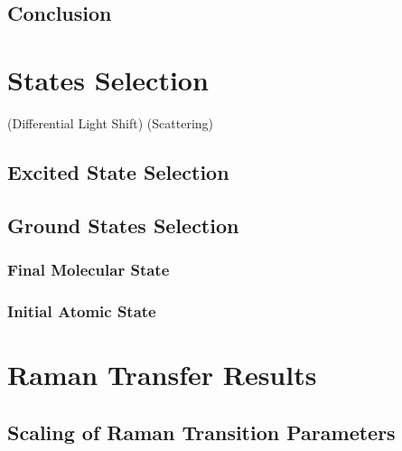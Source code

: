 \subsection{Conclusion}

\section{States Selection}
\label{ch:raman-transfer:state-selction}

(Differential Light Shift)
(Scattering)

\subsection{Excited State Selection}

\subsection{Ground States Selection}

\subsubsection{Final Molecular State}

\subsubsection{Initial Atomic State}

\section{Raman Transfer Results}

\subsection{Scaling of Raman Transition Parameters}
